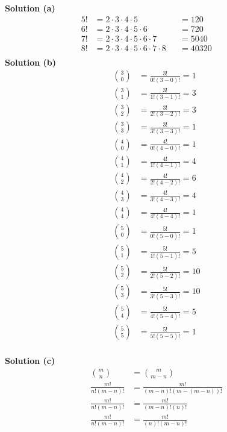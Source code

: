 \textbf{Solution (a)}
\begin{align*}
5! &= 2 \cdot 3 \cdot 4 \cdot 5 &&= 120 &&& \\
6! &= 2 \cdot 3 \cdot 4 \cdot 5 \cdot 6 &&= 720 &&& \\
7! &= 2 \cdot 3 \cdot 4 \cdot 5 \cdot 6 \cdot 7 &&= 5040 &&& \\
8! &= 2 \cdot 3 \cdot 4 \cdot 5 \cdot 6 \cdot 7 \cdot 8 &&= 40320 &&& \\
\end{align*}
\textbf{Solution (b)}
\begin{align*}
\binom{3}{0} &= \frac{3!}{0!(3 - 0)!} = 1 \\
\binom{3}{1} &= \frac{3!}{1!(3 - 1)!} = 3 \\
\binom{3}{2} &= \frac{3!}{2!(3 - 2)!} = 3 \\
\binom{3}{3} &= \frac{3!}{3!(3 - 3)!} = 1 \\
\binom{4}{0} &= \frac{4!}{0!(4 - 0)!} = 1 \\
\binom{4}{1} &= \frac{4!}{1!(4 - 1)!} = 4 \\
\binom{4}{2} &= \frac{4!}{2!(4 - 2)!} = 6 \\
\binom{4}{3} &= \frac{4!}{3!(4 - 3)!} = 4 \\
\binom{4}{4} &= \frac{4!}{4!(4 - 4)!} = 1 \\
\binom{5}{0} &= \frac{5!}{0!(5 - 0)!} = 1 \\
\binom{5}{1} &= \frac{5!}{1!(5 - 1)!} = 5 \\
\binom{5}{2} &= \frac{5!}{2!(5 - 2)!} = 10 \\
\binom{5}{3} &= \frac{5!}{3!(5 - 3)!} = 10 \\
\binom{5}{4} &= \frac{5!}{4!(5 - 4)!} = 5 \\
\binom{5}{5} &= \frac{5!}{5!(5 - 5)!} = 1 \\
\end{align*}


\textbf{Solution (c)}
\begin{align*}
\binom{m}{n} &= \binom{m}{m - n} \\
\frac{m!}{n!(m - n)!} &= \frac{m!}{(m-n)!(m - (m - n))!} \\
\frac{m!}{n!(m - n)!} &= \frac{m!}{(m-n)!(n)!} \\
\frac{m!}{n!(m - n)!} &= \frac{m!}{(n)!(m-n)!} \\
\end{align*}


